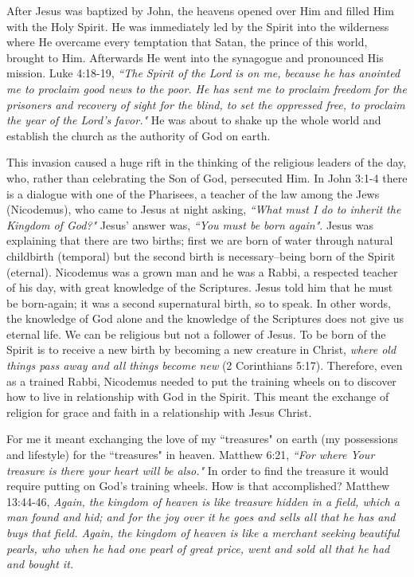 \documentclass[oneside,12pt]{book}
\begin{document}
After Jesus was baptized by John, the heavens opened over Him and filled Him with the Holy Spirit. He was immediately led by the Spirit into the wilderness where He overcame every temptation that Satan, the prince of this world, brought to Him. Afterwards He went into the synagogue and pronounced His mission. Luke 4:18-19, \textit{``The Spirit of the Lord is on me, because he has anointed me to proclaim good news to the poor. He has sent me to proclaim freedom for the prisoners and recovery of sight for the blind, to set the oppressed free, to proclaim the year of the Lord's favor."} He was about to shake up the whole world and establish the church as the authority of God on earth. 

This invasion caused a huge rift in the thinking of the religious leaders of the day, who, rather than celebrating the Son of God, persecuted Him. In John 3:1-4 there is a dialogue with one of the Pharisees, a teacher of the law among the Jews (Nicodemus), who came to Jesus at night asking, \textit{``What must I do to inherit the Kingdom of God?"} Jesus' answer was, \textit{``You must be born again"}. Jesus was explaining that there are two births; first we are born of water through natural childbirth (temporal) but the second birth is necessary--being born of the Spirit (eternal). Nicodemus was a grown man and he was a Rabbi, a respected teacher of his day, with great knowledge of the Scriptures. Jesus told him that he must be born-again; it was a second supernatural birth, so to speak. In other words, the knowledge of God alone and the knowledge of the Scriptures does not give us eternal life. We can be religious but not a follower of Jesus. To be born of the Spirit is to receive a new birth by becoming a new creature in Christ, \textit{where old things pass away and all things become new} (2 Corinthians 5:17). Therefore, even as a trained Rabbi, Nicodemus needed to put the training wheels on to discover how to live in relationship with God in the Spirit. This meant the exchange of religion for grace and faith in a relationship with Jesus Christ. 

For me it meant exchanging the love of my ``treasures" on earth (my possessions and lifestyle) for the ``treasures" in heaven. Matthew 6:21, \textit{``For where Your treasure is there your heart will be also."} In order to find the treasure it would require putting on God's training wheels. How is that accomplished? Matthew 13:44-46, \textit{Again, the kingdom of heaven is like treasure hidden in a field, which a man found and hid; and for the joy over it he goes and sells all that he has and buys that field. Again, the kingdom of heaven is like a merchant seeking beautiful pearls, who when he had one pearl of great price, went and sold all that he had and bought it.}
\end{document}
